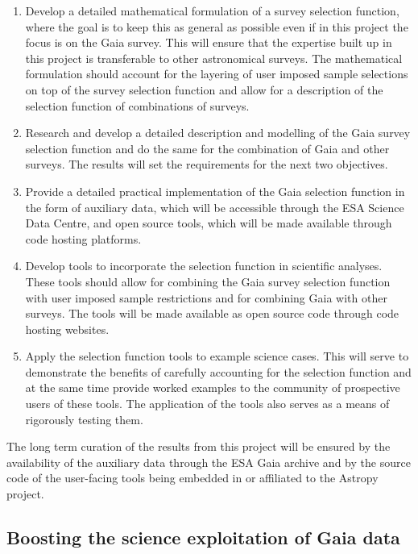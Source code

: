 \begin{enumerate}
    \item Develop a detailed mathematical formulation of a survey selection function, where the goal is to keep this as general as possible even if in this project the focus is on the Gaia survey. This will ensure that the expertise built up in this project is transferable to other astronomical surveys. The mathematical formulation should account for the layering of user imposed sample selections on top of the survey selection function and allow for a description of the selection function of combinations of surveys.
    \item Research and develop a detailed description and modelling of the Gaia survey selection function and do the same for the combination of Gaia and other surveys. The results will set the requirements for the next two objectives.
    \item Provide a detailed practical implementation of the Gaia selection function in the form of auxiliary data, which will be accessible through the ESA Science Data Centre, and open source tools, which will be made available through code hosting platforms. 
    \item Develop tools to incorporate the selection function in scientific analyses. These tools should allow for combining the Gaia survey selection function with user imposed sample restrictions and for combining Gaia with other surveys. The tools will be made available as open source code through code hosting websites.
    \item Apply the selection function tools to example science cases. This will serve to demonstrate the benefits of carefully accounting for the selection function and at the same time provide worked examples to the community of prospective users of these tools. The application of the tools also serves as a means of rigorously testing them.
\end{enumerate}

The long term curation of the results from this project will be ensured by the availability of the auxiliary data through the ESA Gaia archive and by the source code of the user-facing tools being embedded in or affiliated to the Astropy project.

\subsection{Boosting the science exploitation of Gaia data}
\label{sec:needforselectionfunction}

